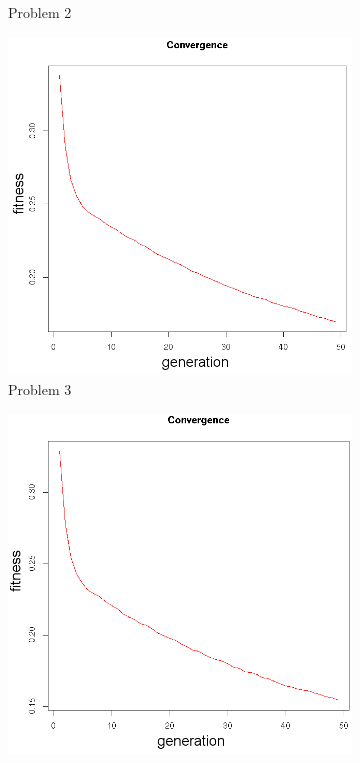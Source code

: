 \begin{figure}[!h]
\begin{subfigure}{0.3\textwidth}
	   \caption{Problem 2}
   \end{subfigure}
   \begin{subfigure}{0.3\textwidth}
       \includegraphics[width=\textwidth]{pics/convergence3.png}
	   \caption{Problem 3}
   \end{subfigure}
   \begin{subfigure}{0.3\textwidth}
       \includegraphics[width=\textwidth]{pics/convergence4.png}

\end{subfigure}
\end{figure}
